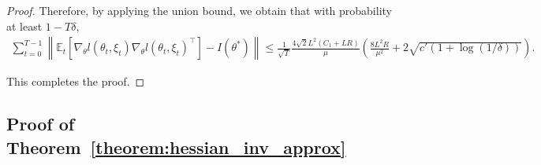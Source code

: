 \documentclass[11 pt]{article}
\begin{document}
\begin{proof}
Therefore, by applying the union bound, we obtain that with probability at least $1-T\delta$,
\begin{align*}
    \sum_{t=0}^{T-1} \left\|\mathbb{E}_{t}[\nabla_\theta l(\theta_t, \xi_t) \nabla_\theta l(\theta_t, \xi_t)^\top] - I(\theta^*)\right\|\leq \frac{1}{\sqrt{T}}\frac{4\sqrt2L^2(C_1+LR)}{\mu}\left(\frac{8L^2R}{\mu^2}+2\sqrt{c'(1+\log(1/\delta))}\right).
\end{align*}

This completes the proof.
\end{proof}


\subsection{Proof of Theorem~\ref{theorem:hessian_inv_approx}} \label{proof:theorem_hessian_inv_approx}
\end{document}
